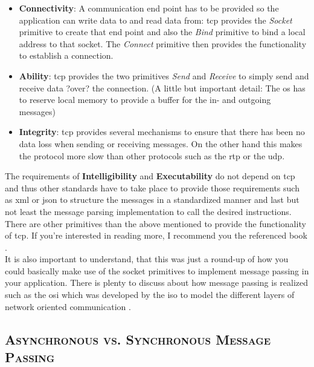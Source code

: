 \documentclass[xcolor=dvipsnames]{article}
\begin{document}
\begin{itemize}

\item \textbf{Connectivity}: A communication end point has to be provided so the application can write data to and read data from: \gls{tcp} provides the \textit{Socket} primitive to create that end point and also the \textit{Bind} primitive to bind a local address to that socket. The \textit{Connect} primitive then provides the functionality to establish a connection.

\item \textbf{Ability}: \gls{tcp} provides the two primitives \textit{Send} and \textit{Receive} to simply send and receive data ?over? the connection. (A little but important detail: The \gls{os} has to reserve local memory to provide a buffer for the in- and outgoing messages)

\item \textbf{Integrity}: \gls{tcp} provides several mechanisms to ensure that there has been no data loss when sending or receiving messages. On the other hand this makes the protocol more slow than other protocols such as the \gls{rtp} or the \gls{udp}.

\end{itemize}

\noindent The requirements of \textbf{Intelligibility} and \textbf{Executability} do not depend on \gls{tcp} and thus other standards have to take place to provide those requirements such as \gls{xml} or \gls{json} to structure the messages in a standardized manner and last but not least the message parsing implementation to call the desired instructions.\\

\noindent There are other primitives than the above mentioned to provide the functionality of \gls{tcp}. If you're interested in reading more, I recommend you the referenced book \cite[ch. 4.3.1 on p. 141]{tanenbaum}.\\

\noindent It is also important to understand, that this was just a round-up of  how you could basically make use of the socket primitives to implement message passing in your application. There is plenty to discuss about how message passing is realized such as the \gls{osi} which was developed by the \gls{iso} to model the different layers of network oriented communication \cite[ch. 4.1.1 on p. 116]{tanenbaum}.

\subsection{\scshape{Asynchronous vs. Synchronous Message Passing}}
\end{document}
